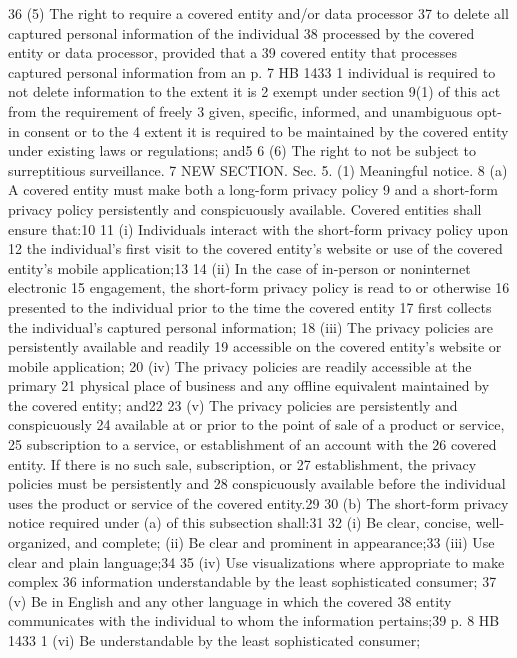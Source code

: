 36 (5) The right to require a covered entity and/or data processor
37 to delete all captured personal information of the individual
38 processed by the covered entity or data processor, provided that a
39 covered entity that processes captured personal information from an
p. 7 HB 1433
1 individual is required to not delete information to the extent it is
2 exempt under section 9(1) of this act from the requirement of freely
3 given, specific, informed, and unambiguous opt-in consent or to the
4 extent it is required to be maintained by the covered entity under
existing laws or regulations; and5
6 (6) The right to not be subject to surreptitious surveillance.
7 NEW SECTION. Sec. 5. (1) Meaningful notice.
8 (a) A covered entity must make both a long-form privacy policy
9 and a short-form privacy policy persistently and conspicuously
available. Covered entities shall ensure that:10
11 (i) Individuals interact with the short-form privacy policy upon
12 the individual's first visit to the covered entity's website or use
of the covered entity's mobile application;13
14 (ii) In the case of in-person or noninternet electronic
15 engagement, the short-form privacy policy is read to or otherwise
16 presented to the individual prior to the time the covered entity
17 first collects the individual's captured personal information;
18 (iii) The privacy policies are persistently available and readily
19 accessible on the covered entity's website or mobile application;
20 (iv) The privacy policies are readily accessible at the primary
21 physical place of business and any offline equivalent maintained by
the covered entity; and22
23 (v) The privacy policies are persistently and conspicuously
24 available at or prior to the point of sale of a product or service,
25 subscription to a service, or establishment of an account with the
26 covered entity. If there is no such sale, subscription, or
27 establishment, the privacy policies must be persistently and
28 conspicuously available before the individual uses the product or
service of the covered entity.29
30 (b) The short-form privacy notice required under (a) of this
subsection shall:31
32 (i) Be clear, concise, well-organized, and complete;
(ii) Be clear and prominent in appearance;33
(iii) Use clear and plain language;34
35 (iv) Use visualizations where appropriate to make complex
36 information understandable by the least sophisticated consumer;
37 (v) Be in English and any other language in which the covered
38 entity communicates with the individual to whom the information
pertains;39
p. 8 HB 1433
1 (vi) Be understandable by the least sophisticated consumer;
